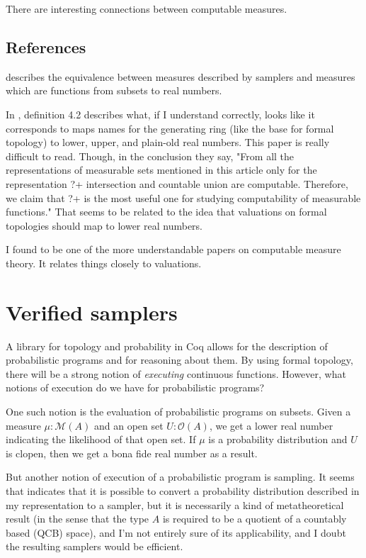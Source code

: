 \documentclass{article}           %
\newcommand{\Dist}[1]{\mathcal{M}({#1})}
\newcommand{\Open}[1]{\mathcal{O}({#1})}
\begin{document}
There are interesting connections between computable measures.

\subsection{References}

\cite{schroder2007} describes the equivalence between measures described by samplers and measures which are functions from subsets to real numbers.

In \cite{weihrauch2014}, definition 4.2 describes what, if I understand correctly, looks like it corresponds to maps names for the generating ring (like the base for formal topology) to lower, upper, and plain-old real numbers. This paper is really difficult to read. Though, in the conclusion they say, "From all the representations of measurable sets mentioned in this article only for the representation ?+ intersection and countable union are computable. Therefore, we claim that ?+ is the most useful one for studying computability of measurable functions." That seems to be related to the idea that valuations on formal topologies should map to lower real numbers.

I found \cite{collins2014} to be one of the more understandable papers on computable measure theory. It relates things closely to valuations.

\section{Verified samplers}

A library for topology and probability in Coq allows for the description of probabilistic programs and for reasoning about them. By using formal topology, there will be a strong notion of \emph{executing} continuous functions. However, what notions of execution do we have for probabilistic programs?

One such notion is the evaluation of probabilistic programs on subsets. Given a measure $\mu : \Dist{A}$ and an open set $U : \Open{A}$, we get a lower real number indicating the likelihood of that open set. If $\mu$ is a probability distribution and $U$ is clopen, then we get a bona fide real number as a result.

But another notion of execution of a probabilistic program is sampling. It seems that \cite{schroder2007} indicates that it is possible to convert a probability distribution described in my representation to a sampler, but it is necessarily a kind of metatheoretical result (in the sense that the type $A$ is required to be a quotient of a countably based (QCB) space), and I'm not entirely sure of its applicability, and I doubt the resulting samplers would be efficient.
\end{document}
